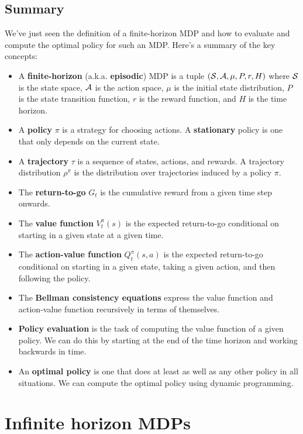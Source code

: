 \documentclass[../main/main]{subfiles}
\begin{document}
\subsection{Summary}

We've just seen the definition of a finite-horizon MDP and how to evaluate and compute the optimal policy for such an MDP. Here's a summary of the key concepts:

\begin{itemize}
    \item A \textbf{finite-horizon} (a.k.a. \textbf{episodic}) MDP is a tuple $(\S, \A, \mu, P, r, H)$ where $\S$ is the state space, $\A$ is the action space, $\mu$ is the initial state distribution, $P$ is the state transition function, $r$ is the reward function, and $H$ is the time horizon.
    \item A \textbf{policy} $\pi$ is a strategy for choosing actions. A \textbf{stationary} policy is one that only depends on the current state.
    \item A \textbf{trajectory} $\tau$ is a sequence of states, actions, and rewards. A trajectory distribution $\rho^\pi$ is the distribution over trajectories induced by a policy $\pi$.
    \item The \textbf{return-to-go} $G_t$ is the cumulative reward from a given time step onwards.
    \item The \textbf{value function} $V_t^\pi(s)$ is the expected return-to-go conditional on starting in a given state at a given time.
    \item The \textbf{action-value function} $Q_t^\pi(s, a)$ is the expected return-to-go conditional on starting in a given state, taking a given action, and then following the policy.
    \item The \textbf{Bellman consistency equations} express the value function and action-value function recursively in terms of themselves.
    \item \textbf{Policy evaluation} is the task of computing the value function of a given policy. We can do this by starting at the end of the time horizon and working backwards in time.
    \item An \textbf{optimal policy} is one that does at least as well as any other policy in all situations. We can compute the optimal policy using dynamic programming.
\end{itemize}


\newpage

\section{Infinite horizon MDPs}
\end{document}
